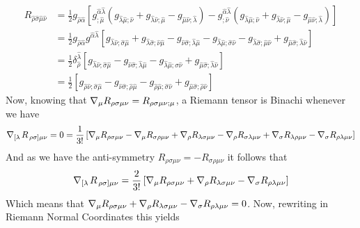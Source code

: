 \documentclass{article}
\begin{document}
		\begin{align*}
			R_{\hat \rho \hat \sigma \hat \mu \hat\nu} &= \frac12 g_{\hat\rho \hat\alpha} \left[  g^{\hat\alpha \hat \lambda}_{;\hat\mu} \left(g_{\hat \lambda \hat \mu; \hat\nu} + g_{\hat \lambda \hat \nu; \hat \mu} - g_{\hat\mu \hat \nu; \hat \lambda} \right) - g_{;\hat\nu}^{\hat\alpha \hat\lambda} \left(g_{\hat \lambda \hat \mu; \hat\nu} + g_{\hat \lambda \hat \nu; \hat \mu} - g_{\hat\mu \hat \nu; \hat \lambda} \right)\right] \\
			&= \frac12 g_{\hat\rho \hat\alpha} g^{\hat\alpha \hat\lambda} \left[ g_{\hat\lambda\hat\nu;\hat\sigma \hat\mu} + g_{\hat\lambda\hat\sigma;\hat\nu \hat\mu} - g_{\hat\nu\hat\sigma;\hat\lambda \hat\mu} - g_{\hat\lambda\hat\mu;\hat\sigma \hat\nu} - g_{\hat\lambda\hat\sigma;\hat\mu \hat\nu} + g_{\hat\mu\hat\sigma;\hat\lambda \hat\nu} \right] \\
			&= \frac12 \delta_{\hat\rho}^{\hat\lambda} \left[g_{\hat\lambda\hat\nu;\hat\sigma \hat\mu}  - g_{\hat\nu\hat\sigma;\hat\lambda \hat\mu} - g_{\hat\lambda\hat\mu;\hat\sigma \hat\nu} + g_{\hat\mu\hat\sigma;\hat\lambda \hat\nu} \right] \\
			&= \frac12 \left[ 
				g_{\hat\rho\hat\nu;\hat\sigma \hat\mu}  - g_{\hat\nu\hat\sigma;\hat\rho \hat\mu} - g_{\hat\rho\hat\mu;\hat\sigma \hat\nu} + g_{\hat\mu\hat\sigma;\hat\rho \hat\nu}
			\right]
		\end{align*}
		Now, knowing that $\nabla_\mu R_{\rho\sigma\mu\nu} = R_{\rho\sigma\mu\nu;\mu}$, a Riemann tensor is Binachi whenever we have
		$$ \nabla_{\left[\lambda\right.} R_{\left. \rho \sigma \right] \mu\nu} = 0 = \frac{1}{3!} \left[ \nabla_\mu R_{\rho\sigma\mu\nu} - \nabla_\mu R_{\sigma\rho\mu\nu} + \nabla_\rho R_{\lambda \sigma \mu \nu} - \nabla_\rho R_{\sigma \lambda \mu \nu} + \nabla_\sigma R_{\lambda \rho \mu \nu} - \nabla_\sigma R_{\rho\lambda \mu \nu}\right]$$
		And as we have the anti-symmetry $R_{\rho\sigma\mu\nu} = - R_{\sigma\rho\mu\nu}$ it follows that
		$$\nabla_{\left[\lambda\right.} R_{\left. \rho \sigma \right] \mu\nu} = \frac{2}{3!} \left[ \nabla_\mu R_{\rho \sigma\mu\nu} + \nabla_\rho R_{\lambda \sigma\mu\nu} - \nabla_\sigma R_{\rho\lambda \mu\nu} \right] $$
		Which means that $\nabla_\mu R_{\rho \sigma\mu\nu} + \nabla_\rho R_{\lambda \sigma\mu\nu} - \nabla_\sigma R_{\rho\lambda \mu\nu} = 0$. Now, rewriting in Riemann Normal Coordinates this yields
\end{document}
